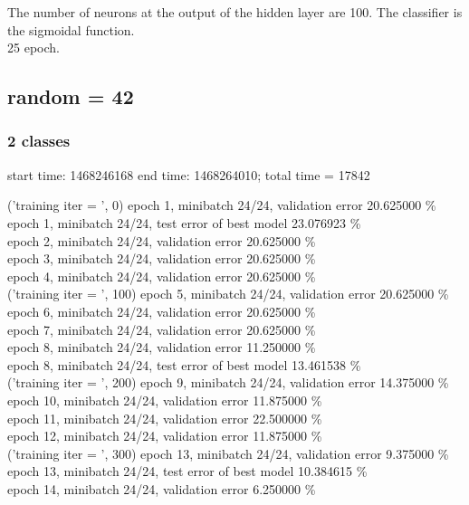 \documentclass[a4paper]{article}
\begin{document}
The number of neurons at the output of the hidden layer are 100. The classifier is the sigmoidal function.\\

25 epoch.\\

\subsection{random = 42}

\subsubsection{2 classes}
start time: 1468246168 end time: 1468264010; total time = 17842

('training \@ iter = ', 0)
epoch 1, minibatch 24/24, validation error 20.625000 \% \\
     epoch 1, minibatch 24/24, test error of best model 23.076923 \% \\
epoch 2, minibatch 24/24, validation error 20.625000 \% \\
epoch 3, minibatch 24/24, validation error 20.625000 \% \\
epoch 4, minibatch 24/24, validation error 20.625000 \% \\
('training \@ iter = ', 100)
epoch 5, minibatch 24/24, validation error 20.625000 \% \\
epoch 6, minibatch 24/24, validation error 20.625000 \% \\
epoch 7, minibatch 24/24, validation error 20.625000 \% \\
epoch 8, minibatch 24/24, validation error 11.250000 \% \\
     epoch 8, minibatch 24/24, test error of best model 13.461538 \% \\
('training \@ iter = ', 200)
epoch 9, minibatch 24/24, validation error 14.375000 \% \\
epoch 10, minibatch 24/24, validation error 11.875000 \% \\
epoch 11, minibatch 24/24, validation error 22.500000 \% \\
epoch 12, minibatch 24/24, validation error 11.875000 \% \\
('training \@ iter = ', 300)
epoch 13, minibatch 24/24, validation error 9.375000 \% \\
     epoch 13, minibatch 24/24, test error of best model 10.384615 \% \\
epoch 14, minibatch 24/24, validation error 6.250000 \% \\
\end{document}
